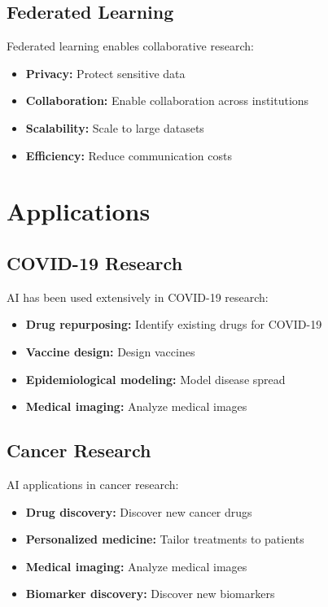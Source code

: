 \subsection{Federated Learning}

Federated learning enables collaborative research:
\begin{itemize}
    \item \textbf{Privacy:} Protect sensitive data
    \item \textbf{Collaboration:} Enable collaboration across institutions
    \item \textbf{Scalability:} Scale to large datasets
    \item \textbf{Efficiency:} Reduce communication costs
\end{itemize}

\section{Applications}

\subsection{COVID-19 Research}

AI has been used extensively in COVID-19 research:
\begin{itemize}
    \item \textbf{Drug repurposing:} Identify existing drugs for COVID-19
    \item \textbf{Vaccine design:} Design vaccines
    \item \textbf{Epidemiological modeling:} Model disease spread
    \item \textbf{Medical imaging:} Analyze medical images
\end{itemize}

\subsection{Cancer Research}

AI applications in cancer research:
\begin{itemize}
    \item \textbf{Drug discovery:} Discover new cancer drugs
    \item \textbf{Personalized medicine:} Tailor treatments to patients
    \item \textbf{Medical imaging:} Analyze medical images
    \item \textbf{Biomarker discovery:} Discover new biomarkers
\end{itemize}


